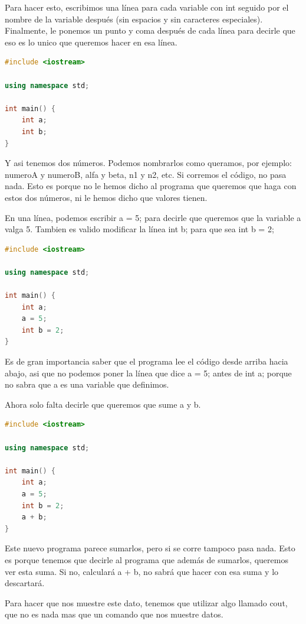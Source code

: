 \documentclass{article}
\begin{document}
Para hacer esto, escribimos una línea para cada variable con int seguido por el nombre de la variable después (sin espacios y sin caracteres especiales). Finalmente, le ponemos un punto y coma después de cada línea para decirle que eso es lo unico que queremos hacer en esa línea.

\begin{lstlisting}[language=C++, caption=Dos variables]
#include <iostream>

using namespace std;

int main() {
    int a;
    int b;
}
\end{lstlisting}

Y asi tenemos dos números. Podemos nombrarlos como queramos, por ejemplo: numeroA y numeroB, alfa y beta, n1 y n2, etc. Si corremos el código, no pasa nada. Esto es porque no le hemos dicho al programa que queremos que haga con estos dos números, ni le hemos dicho que valores tienen.

En una línea, podemos escribir a = 5; para decirle que queremos que la variable a valga 5. Tambien es valido modificar la línea int b; para que sea int b = 2;

\begin{lstlisting}[language=C++, caption=Guardando valores]
#include <iostream>

using namespace std;

int main() {
    int a;
    a = 5;
    int b = 2;
}
\end{lstlisting}

Es de gran importancia saber que el programa lee el código desde arriba hacia abajo, asi que no podemos poner la línea que dice a = 5; antes de int a; porque no sabra que a es una variable que definimos.

Ahora solo falta decirle que queremos que sume a y b.

\begin{lstlisting}[language=C++, caption=Guardando valores]
#include <iostream>

using namespace std;

int main() {
    int a;
    a = 5;
    int b = 2;
    a + b;
}
\end{lstlisting}

Este nuevo programa parece sumarlos, pero si se corre tampoco pasa nada. Esto es porque tenemos que decirle al programa que además de sumarlos, queremos ver esta suma. Si no, calculará a + b, no sabrá que hacer con esa suma y lo descartará.

Para hacer que nos muestre este dato, tenemos que utilizar algo llamado cout, que no es nada mas que un comando que nos muestre datos.
\end{document}
